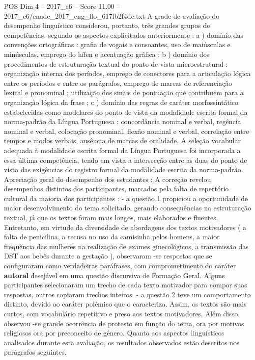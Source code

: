 \begin{textsample}{POS Dim 4 – 2017\_c6 – Score 11.00 – 2017\_c6/enade\_2017\_eng\_flo\_617fb2f4dc.txt}
A grade de avaliação do desempenho linguístico considerou, portanto, três grandes grupos de competências, segundo os aspectos explicitados anteriormente : a ) domínio das convenções ortográficas : grafia de vogais e consoantes, uso de maiúsculas e minúsculas, emprego do hífen e acentuação gráfica ; b ) domínio dos procedimentos de estruturação textual do ponto de vista microestrutural : organização interna dos períodos, emprego de conectores para a articulação lógica entre os períodos e entre os parágrafos, emprego de marcas de referenciação lexical e pronominal ; utilização dos sinais de pontuação que contribuem para a organização lógica da frase ; c ) domínio das regras de caráter morfossintático estabelecidas como modelares do ponto de vista da modalidade escrita formal da norma-padrão da Língua Portuguesa : concordância nominal e verbal, regência nominal e verbal, colocação pronominal, flexão nominal e verbal, correlação entre tempos e modos verbais, ausência de marcas de oralidade.
A seleção vocabular adequada à modalidade escrita formal da Língua Portuguesa foi incorporada a essa última competência, tendo em vista a intersecção entre as duas do ponto de vista das exigências do registro formal da modalidade escrita da norma-padrão.
Apreciação geral do desempenho dos estudantes : A correção revelou desempenhos distintos dos participantes, marcados pela falta de repertório cultural da maioria dos participantes : - a questão 1 propiciou a oportunidade de maior desenvolvimento do tema solicitado, gerando consequências na estruturação textual, já que os textos foram mais longos, mais elaborados e fluentes.
Entretanto, em virtude da diversidade de abordagens dos textos motivadores ( a falta de penicilina, a recusa no uso da camisinha pelos homens, a maior frequência das mulheres na realização de exames ginecológicos, a transmissão das DST aos bebês durante a gestação ), observaram -se respostas que se configuraram como verdadeiras paráfrases, com comprometimento do caráter \textbf{autoral} desejável em uma questão discursiva de Formação Geral.
Alguns participantes selecionaram um trecho de cada texto motivador para compor suas respostas, outros copiaram trechos inteiros. - a questão 2 teve um comportamento distinto, devido ao caráter polêmico que o caracteriza.
Assim, os textos são mais curtos, com vocabulário repetitivo e preso aos textos motivadores.
Além disso, observou -se grande ocorrência de protesto em função do tema, ora por motivos religiosos ora por preconceito de gênero.
Quanto aos aspectos linguísticos analisados durante esta avaliação, os resultados observados estão descritos nos parágrafos seguintes.

\end{textsample}
